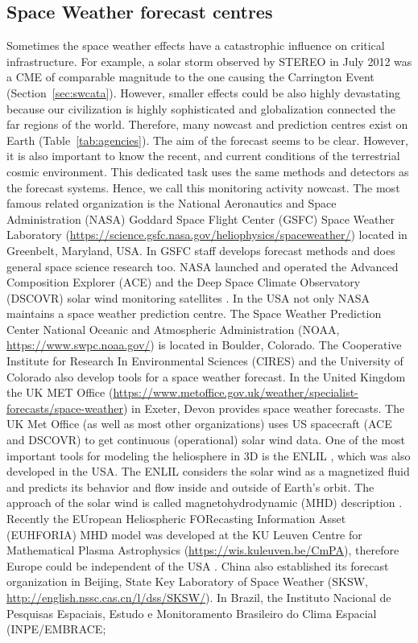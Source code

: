 \documentclass[sn-aps]{sn-jnl}%
\begin{document}
\subsection{Space Weather forecast centres}
\label{sec:swpred}

Sometimes the space weather effects have a catastrophic influence on critical infrastructure. For example, a solar storm observed by STEREO in July 2012 was a CME of comparable magnitude to the one causing the Carrington Event (Section~\ref{sec:swcata}). However, smaller effects could be also highly devastating because our civilization is highly sophisticated and globalization connected the far regions of the world. Therefore, many nowcast and prediction centres exist on Earth (Table~\ref{tab:agencies}). The aim of the forecast seems to be clear. However, it is also important to know the recent, and current conditions of the terrestrial cosmic environment. This dedicated task uses the same methods and detectors as the forecast systems. Hence, we call this monitoring activity nowcast. The most famous related organization is the National Aeronautics and Space Administration (NASA) Goddard Space Flight Center (GSFC) Space Weather Laboratory (\url{https://science.gsfc.nasa.gov/heliophysics/spaceweather/}) located in Greenbelt, Maryland, USA. In GSFC staff develops forecast methods and does general space science research too. NASA launched and operated the Advanced Composition Explorer (ACE) and the Deep Space Climate Observatory (DSCOVR) solar wind monitoring satellites \cite{stone98:_advan_compos_explor,lotoaniu22:_valid_dscov_spacec_mission_space}. In the USA not only NASA maintains a space weather prediction centre. The Space Weather Prediction Center National Oceanic and Atmospheric Administration (NOAA, \url{https://www.swpc.noaa.gov/}) is located in Boulder, Colorado. The Cooperative Institute for Research In Environmental Sciences (CIRES) and the University of Colorado also develop tools for a space weather forecast. In the United Kingdom the UK MET Office (\url{https://www.metoffice.gov.uk/weather/specialist-forecasts/space-weather}) in Exeter, Devon provides space weather forecasts. The UK Met Office (as well as most other organizations) uses US spacecraft (ACE and DSCOVR) to get continuous (operational) solar wind data. One of the most important tools for modeling the heliosphere in 3D is the ENLIL \cite{odstrcil03:_model_d}, which was also developed in the USA. The ENLIL considers the solar wind as a magnetized fluid and predicts its behavior and flow inside and outside of Earth's orbit. The approach of the solar wind is called magnetohydrodynamic (MHD) description \cite{baumjohann96:_basic}.  Recently the EUropean Heliospheric FORecasting Information Asset (EUHFORIA) MHD model was developed at the KU Leuven Centre for Mathematical Plasma Astrophysics (\url{https://wis.kuleuven.be/CmPA}), therefore Europe could be independent of the USA \cite{pomoell18:_euhfor}. China also established its forecast organization in Beijing, State Key Laboratory of Space Weather  (SKSW, \url{http://english.nssc.cas.cn/l/dss/SKSW/}). In Brazil, the Instituto Nacional de Pesquisas Espaciais, Estudo e Monitoramento Brasileiro do Clima Espacial (INPE/EMBRACE; 
\end{document}
